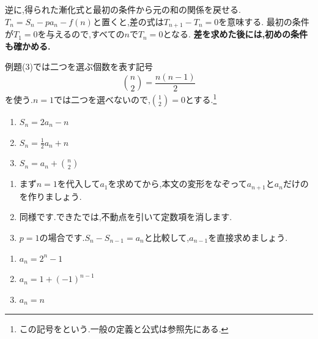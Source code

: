     逆に,得られた漸化式と最初の条件から元の和の関係を戻せる.
    $T_n=S_n-pa_n-f(n)$と置くと,差の式は$T_{n+1}-T_n=0$を意味する.
    最初の条件が$T_1=0$を与えるので,すべての$n$で$T_n=0$となる.
    \textbf{差を求めた後には,初めの条件も確かめる.}

    例題(3)では二つを選ぶ個数を表す記号
    \[
      \binom n2=\frac{n(n-1)}2
    \]
    を使う.$n=1$では二つを選べないので,$\binom12=0$とする.\footnote{この記号をという.一般の定義と公式は参照先にある.}
    \noindent {}\par\nobreak
    \begin{enumerate}[label=(\arabic*),parsep=3pt,format=\bookitemlink{example-summation-1}{problem}{answer}]
      \item $\displaystyle S_n=2a_n-n$
      \item $\displaystyle S_n=\frac12a_n+n$
      \item $\displaystyle S_n=a_n+\binom n2$
    \end{enumerate}

    \noindent{}\par\nobreak
    \begin{enumerate}[label=(\arabic*),parsep=3pt,format=\bookitemlink{example-summation-1}{hint}{problem}]
      \item まず$n=1$を代入して$a_1$を求めてから,本文の変形をなぞって$a_{n+1}$と$a_n$だけのを作りましょう.
      \item 同様です.できたでは,不動点を引いて定数項を消します.
      \item $p=1$の場合です.$S_n-S_{n-1}=a_n$と比較して,$a_{n-1}$を直接求めましょう.
    \end{enumerate}

    \noindent{}\par\nobreak
    \begin{enumerate}[label=(\arabic*),parsep=3pt,format=\bookitemlink{example-summation-1}{answer}{problem}]
      \item $\displaystyle a_n=2^n-1$
      \item $\displaystyle a_n=1+(-1)^{n-1}$
      \item $\displaystyle a_n=n$
    \end{enumerate}

